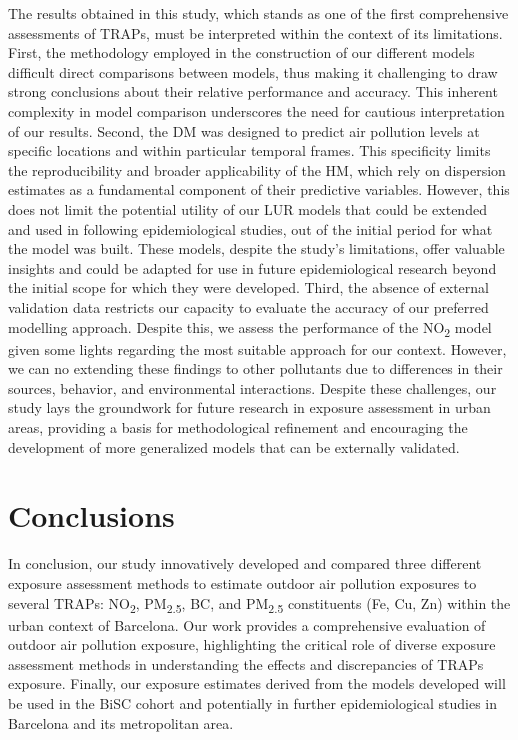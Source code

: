 \documentclass{article}
\begin{document}
The results obtained in this study, which stands as one of the first comprehensive assessments of TRAPs, must be interpreted within the context of its limitations. 
First, the methodology employed in the construction of our different models difficult direct comparisons between models, thus making it challenging to draw strong conclusions about their relative performance and accuracy. This inherent complexity in model comparison underscores the need for cautious interpretation of our results. Second, the DM was designed to predict air pollution levels at specific locations and within particular temporal frames. This specificity limits the reproducibility and broader applicability of the HM, which rely on dispersion estimates as a fundamental component of their predictive variables. However, this does not limit the potential utility of our LUR models that could be extended and used in  following epidemiological studies, out of the initial period for what the model was built. These models, despite the study's limitations, offer valuable insights and could be adapted for use in future epidemiological research beyond the initial scope for which they were developed. Third, the absence of external validation data restricts our capacity to evaluate  the accuracy of our preferred modelling approach. Despite this, we assess the performance of the NO\textsubscript{2} model given some lights regarding the most suitable approach for our context. However, we can no extending these findings to other pollutants due to differences in their sources, behavior, and environmental interactions. Despite these challenges, our study lays the groundwork for future research in exposure assessment in urban areas, providing a basis for methodological refinement and encouraging the development of more generalized models that can be  externally validated. 

\section{Conclusions}

In conclusion, our study innovatively developed and compared three different exposure assessment methods to estimate outdoor air pollution exposures to several TRAPs: NO\textsubscript{2}, PM\textsubscript{2.5}, BC, and PM\textsubscript{2.5} constituents (Fe, Cu, Zn) within the urban context of Barcelona. Our work provides a comprehensive evaluation of outdoor air pollution exposure, highlighting the critical role of diverse exposure assessment methods in understanding the effects and discrepancies of TRAPs exposure. Finally, our exposure estimates derived from the models developed will be used in the BiSC cohort and potentially in further epidemiological studies in Barcelona and its metropolitan area.

\newpage


\end{document}
